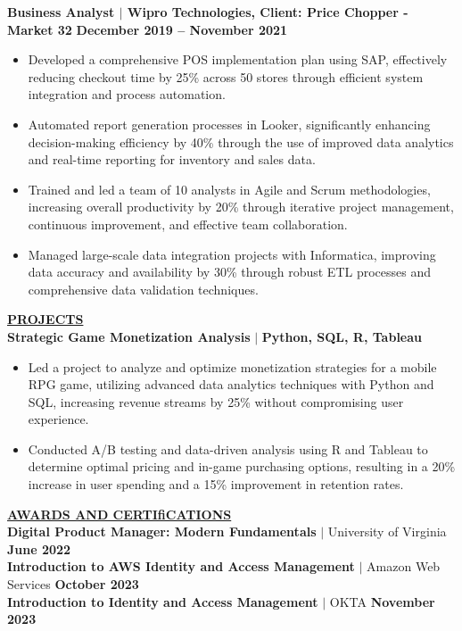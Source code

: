 \documentclass{article}
\begin{document}
\noindent \textbf{Business Analyst $\mid$ Wipro Technologies, Client: Price Chopper - Market 32} \hfill \textbf{December 2019 – November 2021}
\begin{itemize}[noitemsep,nolistsep,leftmargin=*]
\item {\small Developed a comprehensive POS implementation plan using SAP, effectively reducing checkout time by 25\% across 50 stores through efficient system integration and process automation.}
\item {\small Automated report generation processes in Looker, significantly enhancing decision-making efficiency by 40\% through the use of improved data analytics and real-time reporting for inventory and sales data.}
\item {\small Trained and led a team of 10 analysts in Agile and Scrum methodologies, increasing overall productivity by 20\% through iterative project management, continuous improvement, and effective team collaboration.}
\item {\small Managed large-scale data integration projects with Informatica, improving data accuracy and availability by 30\% through robust ETL processes and comprehensive data validation techniques.}
\end{itemize}

\vspace{2mm}
\noindent \textbf{\underline{PROJECTS}} \\
\textbf{Strategic Game Monetization Analysis} $\mid$ \textbf{Python, SQL, R, Tableau}
\begin{itemize}[noitemsep,nolistsep,leftmargin=*]
\item {\small Led a project to analyze and optimize monetization strategies for a mobile RPG game, utilizing advanced data analytics techniques with Python and SQL, increasing revenue streams by 25\% without compromising user experience.}
\item {\small Conducted A/B testing and data-driven analysis using R and Tableau to determine optimal pricing and in-game purchasing options, resulting in a 20\% increase in user spending and a 15\% improvement in retention rates.}
\end{itemize}
\vspace{2mm}
\noindent \textbf{\underline{AWARDS AND CERTIfiCATIONS}} \\
\noindent \textbf{Digital Product Manager: Modern Fundamentals} $\mid$ University of Virginia  \hfill \textbf{June 2022}\\
\noindent \textbf{Introduction to AWS Identity and Access Management} $\mid$ Amazon Web Services \hfill \textbf{October 2023}\\
\noindent \textbf{Introduction to Identity and Access Management} $\mid$ OKTA \hfill \textbf{November 2023}
\end{document}
